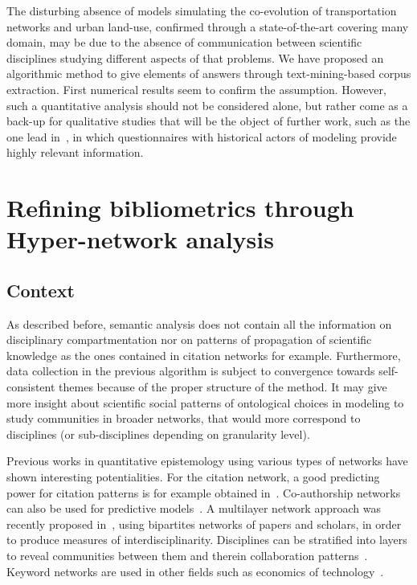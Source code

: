 The disturbing absence of models simulating the co-evolution of transportation networks and urban land-use, confirmed through a state-of-the-art covering many domain, may be due to the absence of communication between scientific disciplines studying different aspects of that problems. We have proposed an algorithmic method to give elements of answers through text-mining-based corpus extraction. First numerical results seem to confirm the assumption. However, such a quantitative analysis  should not be considered alone, but rather come as a back-up for qualitative studies that will be the object of further work, such as the one lead in~\cite{commenges:tel-00923682}, in which questionnaires with historical actors of modeling provide highly relevant information.






\newpage


\section{Refining bibliometrics through Hyper-network analysis}

\subsection{Context}

As described before, semantic analysis does not contain all the information on disciplinary compartmentation nor on patterns of propagation of scientific knowledge as the ones contained in citation networks for example. Furthermore, data collection in the previous algorithm is subject to convergence towards self-consistent themes because of the proper structure of the method. It may give more insight about scientific social patterns of ontological choices in modeling to study communities in broader networks, that would more correspond to disciplines (or sub-disciplines depending on granularity level).

Previous works in quantitative epistemology using various types of networks have shown interesting potentialities. For the citation network, a good predicting power for citation patterns is for example obtained in~\cite{2013arXiv1310.8220N}. Co-authorship networks can also be used for predictive models~\cite{2014arXiv1402.7268S}. A multilayer network approach was recently proposed in~\cite{2016arXiv160106075O}, using bipartites networks of papers and scholars, in order to produce measures of interdisciplinarity. Disciplines can be stratified into layers to reveal communities between them and therein collaboration patterns~\cite{2015arXiv150601280B}. Keyword networks are used in other fields such as economics of technology~\cite{choi2014patent,shibata2008detecting}.


